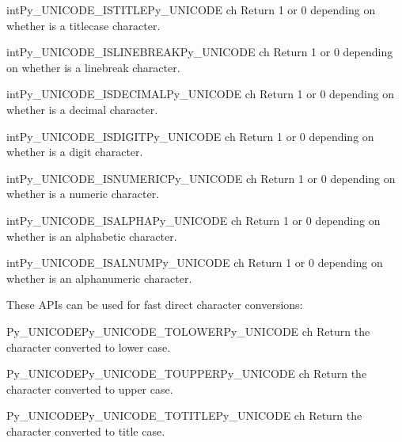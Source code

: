 \begin{cfuncdesc}{int}{Py_UNICODE_ISTITLE}{Py_UNICODE ch}
  Return 1 or 0 depending on whether  is a titlecase character.
\end{cfuncdesc}

\begin{cfuncdesc}{int}{Py_UNICODE_ISLINEBREAK}{Py_UNICODE ch}
  Return 1 or 0 depending on whether  is a linebreak character.
\end{cfuncdesc}

\begin{cfuncdesc}{int}{Py_UNICODE_ISDECIMAL}{Py_UNICODE ch}
  Return 1 or 0 depending on whether  is a decimal character.
\end{cfuncdesc}

\begin{cfuncdesc}{int}{Py_UNICODE_ISDIGIT}{Py_UNICODE ch}
  Return 1 or 0 depending on whether  is a digit character.
\end{cfuncdesc}

\begin{cfuncdesc}{int}{Py_UNICODE_ISNUMERIC}{Py_UNICODE ch}
  Return 1 or 0 depending on whether  is a numeric character.
\end{cfuncdesc}

\begin{cfuncdesc}{int}{Py_UNICODE_ISALPHA}{Py_UNICODE ch}
  Return 1 or 0 depending on whether  is an alphabetic
  character.
\end{cfuncdesc}

\begin{cfuncdesc}{int}{Py_UNICODE_ISALNUM}{Py_UNICODE ch}
  Return 1 or 0 depending on whether  is an alphanumeric
  character.
\end{cfuncdesc}

These APIs can be used for fast direct character conversions:

\begin{cfuncdesc}{Py_UNICODE}{Py_UNICODE_TOLOWER}{Py_UNICODE ch}
  Return the character  converted to lower case.
\end{cfuncdesc}

\begin{cfuncdesc}{Py_UNICODE}{Py_UNICODE_TOUPPER}{Py_UNICODE ch}
  Return the character  converted to upper case.
\end{cfuncdesc}

\begin{cfuncdesc}{Py_UNICODE}{Py_UNICODE_TOTITLE}{Py_UNICODE ch}
  Return the character  converted to title case.
\end{cfuncdesc}

